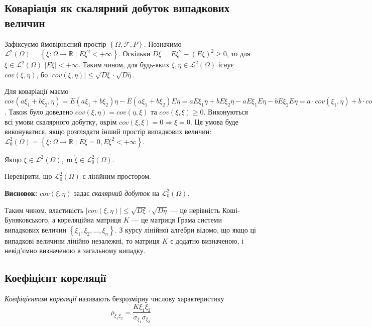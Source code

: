 \subsection{Коваріація як скалярний добуток випадкових величин}
Зафіксуємо ймовірнісний простір $\left\{\Omega, \mathcal{F}, P\right\}$.
Позначимо $\mathcal{L}^2(\Omega) = \left\{\xi : \Omega \rightarrow \mathbb{R} \;|\; E\xi^2 < +\infty\right\}$.
Оскільки $D\xi = E\xi^2 - (E\xi)^2 \geq 0$, то для $\xi \in \mathcal{L}^2(\Omega)$ $|E\xi| < +\infty$.
Таким чином, для будь-яких $\xi, \eta \in \mathcal{L}^2(\Omega)$ 
існує ${cov}(\xi,\eta)$, бо $|{cov}(\xi,\eta)| \leq \sqrt{D\xi} \cdot \sqrt{D\eta}$.

Для коваріації маємо 
${cov}(a\xi_1 + b\xi_2,\eta) = E(a\xi_1+b\xi_2)\eta - E(a\xi_1 + b\xi_2)E\eta = 
a E\xi_1\eta + b E\xi_2\eta - a E\xi_1 E\eta - b E\xi_2 E\eta = a\cdot{cov}(\xi_1,\eta) + b\cdot{cov}(\xi_2,\eta)$.
Також було доведено ${cov}(\xi, \eta) = {cov}(\eta, \xi)$ та ${cov}(\xi, \xi) \geq 0$.
Виконуються всі умови скалярного добутку, окрім ${cov}(\xi, \xi) = 0 \Rightarrow \xi = 0$.
Ця умова буде виконуватися, якщо розглядати інший простір випадкових величин:
$\mathcal{L}_0^2(\Omega) = \left\{\xi : \Omega \rightarrow \mathbb{R} \;|\; E\xi = 0, E\xi^2 < +\infty\right\}$.
\begin{remark}
    Якщо $\xi \in \mathcal{L}^2(\Omega)$, то $\mathring{\xi} \in \mathcal{L}_0^2(\Omega)$.
\end{remark}
\begin{exercise}
    Перевірити, що $\mathcal{L}_0^2(\Omega)$ є лінійним простором.
\end{exercise}

\noindent \textbf{Висновок:} ${cov}(\xi, \eta)$ задає \emph{скалярний добуток} на $\mathcal{L}_0^2(\Omega)$.

Таким чином, властивість $|{cov}(\xi,\eta)| \leq \sqrt{D\xi} \cdot \sqrt{D\eta}$ ---
це нерівність Коші-Буняковського, а кореляційна матриця $K$ --- це матриця Грама системи
випадкових величин $\left\{\xi_1, \xi_2, ..., \xi_n\right\}$.
З курсу лінійної алгебри відомо, що якщо ці випадкові величини лінійно незалежні, то матриця $K$ є додатно визначеною, 
і невід'ємно визначеною в загальному випадку.

\subsection{Коефіцієнт кореляції}
\begin{definition}
    \emph{Коефіцієнтом кореляції} називають безрозмірну числову характеристику
    \begin{equation*}
        \rho_{\xi_1\xi_2} = \frac{K\xi_1\xi_2}{\sigma_{\xi_1}\sigma_{\xi_2}}
    \end{equation*}
\end{definition}


